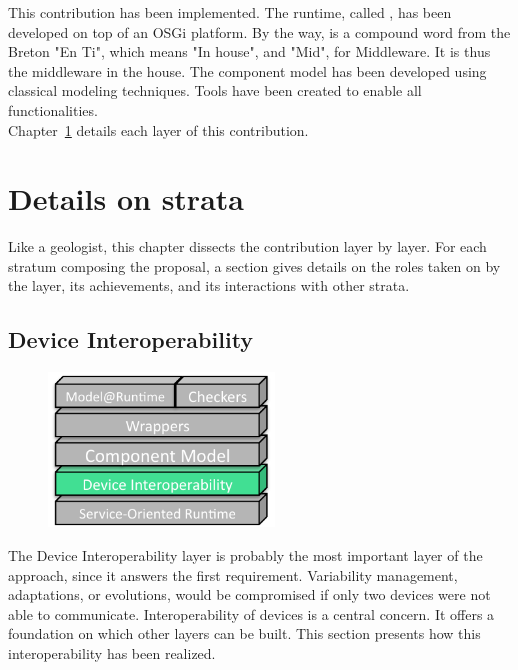\par This contribution has been implemented. The runtime, called \enti{}, has been developed on top of an OSGi platform. By the way, \enti{} is a compound word from the Breton "En Ti", which means "In house", and "Mid", for Middleware. It is thus the middleware in the house. The component model has been developed using classical modeling techniques. Tools have been created to enable all functionalities.\\
Chapter~\ref{ch:detailsStrata} details each layer of this contribution.


\chapter{Details on strata}
\label{ch:detailsStrata}


Like a geologist, this chapter dissects the contribution layer by layer. For each stratum composing the proposal, a section gives details on the roles taken on by the layer, its achievements, and its interactions with other strata.

\section{Device Interoperability}

\begin{figure}
  \vspace{-5mm}
  \includegraphics[width=60mm]{part2/pics/layers/DevicesInterop.pdf}
  \vspace{-5mm}
\end{figure}

The Device Interoperability layer is probably the most important layer of the approach, since it answers the first requirement. Variability management, adaptations, or evolutions, would be compromised if only two devices were not able to communicate. Interoperability of devices is a central concern. It offers a foundation on which other layers can be built. This section presents how this interoperability has been realized.\\

